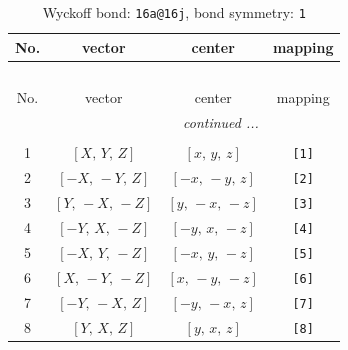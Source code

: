 \documentclass[fleqn,8pt]{jsarticle}
\begin{document}
\begin{longtable}{cccc}
\caption{Wyckoff bond: {\tt 16a@16j}, bond symmetry: {\tt 1}}
 \\
 \hline \hline
No. & vector & center & mapping \\ \hline \endfirsthead

\multicolumn{3}{l}{\tablename\ \thetable{}} \\
 \hline \hline
No. & vector & center & mapping \\ \hline \endhead

 \hline \hline
\multicolumn{3}{r}{\footnotesize\it continued ...} \\ \endfoot

 \hline \hline
\multicolumn{3}{r}{} \\ \endlastfoot

1 & $\left[ X,\, Y,\, Z \right]$ & $\left[ x,\, y,\, z \right]$ & {\tt [1]} \\ \hline
2 & $\left[ - X,\, - Y,\, Z \right]$ & $\left[ - x,\, - y,\, z \right]$ & {\tt [2]} \\ \hline
3 & $\left[ Y,\, - X,\, - Z \right]$ & $\left[ y,\, - x,\, - z \right]$ & {\tt [3]} \\ \hline
4 & $\left[ - Y,\, X,\, - Z \right]$ & $\left[ - y,\, x,\, - z \right]$ & {\tt [4]} \\ \hline
5 & $\left[ - X,\, Y,\, - Z \right]$ & $\left[ - x,\, y,\, - z \right]$ & {\tt [5]} \\ \hline
6 & $\left[ X,\, - Y,\, - Z \right]$ & $\left[ x,\, - y,\, - z \right]$ & {\tt [6]} \\ \hline
7 & $\left[ - Y,\, - X,\, Z \right]$ & $\left[ - y,\, - x,\, z \right]$ & {\tt [7]} \\ \hline
8 & $\left[ Y,\, X,\, Z \right]$ & $\left[ y,\, x,\, z \right]$ & {\tt [8]} \\
\end{longtable}
\end{document}
